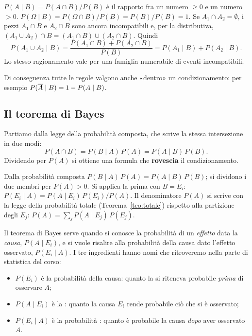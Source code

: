 \begin{dimostrazione}
 $P(A \mid B) = P(A \cap B)/P(B)$ è il rapporto fra un numero $\geq 0$ e un numero $> 0$.
 $P(\Omega \mid B) = P(\Omega \cap B)/P(B) = P(B)/P(B) = 1$.
 Se $A_1 \cap A_2 = \emptyset$, i pezzi $A_1 \cap B$ e $A_2 \cap B$ sono ancora incompatibili e, per la
distributiva, $(A_1 \cup A_2) \cap B = (A_1 \cap B) \cup (A_2 \cap B)$. Quindi
\[ P(A_1 \cup A_2 \mid B) = \frac{P(A_1 \cap B) + P(A_2 \cap B)}{P(B)} = P(A_1 \mid B) + P(A_2 \mid B) . \]
Lo stesso ragionamento vale per una famiglia numerabile di eventi incompatibili.
\end{dimostrazione}

Di conseguenza tutte le regole valgono anche «dentro» un condizionamento: per esempio
$P(\overline{A} \mid B) = 1 - P(A \mid B)$.

\subsection{Il teorema di Bayes}

Partiamo dalla legge della probabilità composta, che scrive la stessa intersezione in due modi:
\[ P(A \cap B) = P(B \mid A)\,P(A) = P(A \mid B)\,P(B) . \]
Dividendo per $P(A)$ si ottiene una formula che \textbf{rovescia} il condizionamento.


\begin{dimostrazione}
 Dalla probabilità composta $P(B \mid A)\,P(A) = P(A \mid B)\,P(B)$; si dividono i due membri per
$P(A) > 0$.
 Si applica la prima con $B = E_i$: $P(E_i \mid A) = P(A \mid E_i)\,P(E_i)/P(A)$. Il
denominatore $P(A)$ si scrive con la legge della probabilità totale (Teorema~\ref{teo:totale}) rispetto alla
partizione degli $E_j$: $P(A) = \sum_j P(A \mid E_j)\,P(E_j)$.
\end{dimostrazione}

Il teorema di Bayes serve quando si conosce la probabilità di un \emph{effetto} data la \emph{causa}, $P(A \mid E_i)$,
e si vuole risalire alla probabilità della causa dato l'effetto osservato, $P(E_i \mid A)$. I tre ingredienti hanno
nomi che ritroveremo nella parte di statistica del corso:
\begin{itemize}
  \item $P(E_i)$ è la probabilità  della causa: quanto la si riteneva probabile \emph{prima} di
        osservare $A$;
  \item $P(A \mid E_i)$ è la : quanto la causa $E_i$ rende probabile ciò che si è osservato;
  \item $P(E_i \mid A)$ è la probabilità : quanto è probabile la causa \emph{dopo} aver osservato
        $A$.
\end{itemize}

